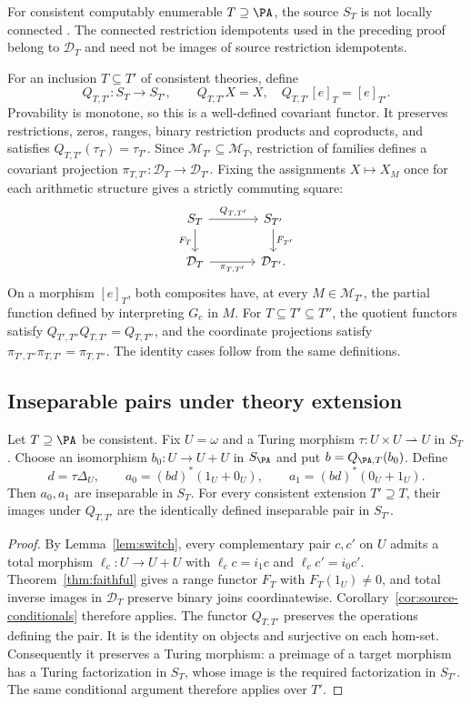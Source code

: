 For consistent computably enumerable $T\supseteq\PA$, the source $S_T$
is not locally connected \cite[Corollary 4.4, pp.~657--658]{DPM}.
The connected restriction idempotents used in the preceding proof
belong to $\mathcal D_T$ and need not be images of source restriction
idempotents.

For an inclusion $T\subseteq T'$ of consistent theories, define
\[
 Q_{T,T'}:S_T\to S_{T'},\qquad
 Q_{T,T'}X=X,\quad Q_{T,T'}[e]_T=[e]_{T'}.
\]
Provability is monotone, so this is a well-defined covariant functor.
It preserves restrictions, zeros, ranges, binary restriction products
and coproducts, and satisfies $Q_{T,T'}(\tau_T)=\tau_{T'}$.
Since $\mathcal M_{T'}\subseteq\mathcal M_T$, restriction of families
defines a covariant projection
$\pi_{T,T'}:\mathcal D_T\to\mathcal D_{T'}$. Fixing the assignments
$X\mapsto X_M$ once for each arithmetic structure gives a strictly
commuting square:
\[
\begin{tikzcd}[column sep=large]
 S_T \arrow[r,"Q_{T,T'}"] \arrow[d,"F_T"'] &
 S_{T'} \arrow[d,"F_{T'}"]\\
 \mathcal D_T \arrow[r,"\pi_{T,T'}"'] & \mathcal D_{T'}.
\end{tikzcd}
\]
On a morphism $[e]_T$, both composites have, at every
$M\in\mathcal M_{T'}$, the partial function defined by interpreting
$G_e$ in $M$. For $T\subseteq T'\subseteq T''$, the quotient
functors satisfy $Q_{T',T''}Q_{T,T'}=Q_{T,T''}$, and the coordinate
projections satisfy
$\pi_{T',T''}\pi_{T,T'}=\pi_{T,T''}$.
The identity cases follow from the same definitions.

\subsection{Inseparable pairs under theory extension}

\begin{corollary}\label{cor:pair}
Let $T\supseteq\PA$ be consistent.
Fix $U=\omega$ and a Turing morphism
$\tau:U\times U\rightharpoonup U$ in $S_T$.
Choose an isomorphism $b_0:U\to U+U$ in $S_{\PA}$ and put
$b=Q_{\PA,T}(b_0)$. Define
\[
 d=\tau\Delta_U,\qquad
 a_0=(bd)^*(1_U+0_U),\qquad a_1=(bd)^*(0_U+1_U).
\]
Then $a_0,a_1$ are inseparable in $S_T$. For every consistent
extension $T'\supseteq T$, their images under $Q_{T,T'}$ are the
identically defined inseparable pair in $S_{T'}$.
\end{corollary}
\begin{proof}
By Lemma~\ref{lem:switch}, every complementary pair $c,c'$ on $U$
admits a total morphism $\ell_c:U\to U+U$ with
$\ell_cc=i_1c$ and $\ell_cc'=i_0c'$.
Theorem~\ref{thm:faithful} gives a range functor $F_T$ with
$F_T(1_U)\ne0$, and total inverse images in $\mathcal D_T$ preserve
binary joins coordinatewise. Corollary~\ref{cor:source-conditionals}
therefore applies.
The functor $Q_{T,T'}$ preserves the operations defining the pair.
It is the identity on objects and surjective on each hom-set.
Consequently it preserves a Turing morphism: a preimage of a
target morphism has a Turing factorization in $S_T$, whose image is
the required factorization in $S_{T'}$.
The same conditional argument therefore applies over $T'$.
\end{proof}

